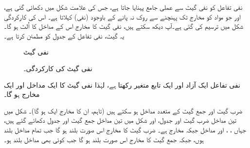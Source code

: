 نفی  تفاعل کو نفی گیٹ سے  عملی جامع پہنایا  جاتا ہے،  جس کی علامت شکل   میں دکھائی گئی ہے، اور جو  مواد کو مخارج تک پہنچنے سے    روک نہ  پانے کے  باوجود   (نفی)  کہلاتا ہے۔ اس کی کارکردگی شکل    میں ترسیم کی  گئی ہے۔آپ دیکھ سکتے ہیں،  نفی گیٹ کا مخارج اس کے مداخل کا اُلٹ  ہو گا۔ یہ گیٹ، نفی تفاعل کے جدول کو مطمئن کرتا ہے۔

\begin{figure}
\centering
\begin{minipage}[b]{0.4\textwidth}
\centering
{}
\caption{نفی گیٹ}
\label{شکل_بوولین_نفی_گیٹ}
\end{minipage}\hfill
\begin{minipage}[b]{0.6\textwidth}
\centering
{}
\caption{نفی گیٹ کی کارکردگی۔}
\label{شکل_بوولین_نفی_کارکردگی}
\end{minipage}
\end{figure}

نفی تفاعل ایک  آزاد اور ایک  تابع متغیر رکھتا ہے، لہٰذا  نفی گیٹ کا ایک  مداخل اور ایک  مخارج ہو گا۔

 ضرب گیٹ اور جمع گیٹ کے   متعدد  مداخل      ہو سکتے ہیں  (تاہم،  ان کا مخارج  ایک  ہو گا)۔  شکل    میں تین مداخل ضرب گیٹ اور جدول،  اور شکل   میں تین مداخل  جمع گیٹ اور جدول  دکھائے گئے ہیں، جہاں ، ، اور  مداخل جبکہ  مخارج ہے۔ ضرب گیٹ کا مخارج اس  صورت بلند ہو گا جب  تمام مداخل بلند ہوں، جبکہ جمع گیٹ کا مخارج اس صورت بلند ہو گا جب کوئی بھی مداخل بلند ہو۔
 
